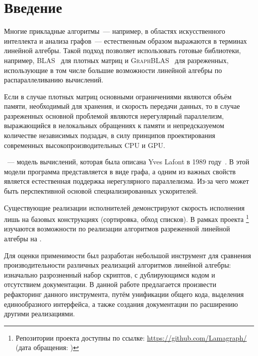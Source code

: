 
\section*{Введение}

Многие прикладные алгоритмы~--- например, в областях искусственного интеллекта и анализа графов~--- естественным образом выражаются в терминах линейной алгебры.
Такой подход позволяет использовать готовые библиотеки, например, \textsc{BLAS}~\cite{blas} для плотных матриц и \textsc{GraphBLAS}~\cite{graphblas} для разреженных, использующие в том числе большие возможности линейной алгебры по распараллеливанию вычислений.

Если в случае плотных матриц основными ограничениями являются объём памяти, необходимый для хранения, и скорость передачи данных, то в случае разреженных основной проблемой являются нерегулярный параллелизм, выражающийся в нелокальных обращениях к памяти и непредсказуемом количестве независимых подзадач, в силу принципов проектирования современных высокопроизводительных CPU и GPU.

\INs{}~--- модель вычислений, которая была описана Yves Lafont в 1989 году~\cite{lafontInteractionNets1989}.
В этой модели программа представляется в виде графа, а одним из важных свойств является естественная поддержка нерегулярного параллелизма.
Из-за чего \INs{} может быть перспективной основой специализированных ускорителей.

Существующие реализации исполнителей \INs{} демонстрируют скорость исполнения лишь на базовых конструкциях (сортировка, обход списков).
В рамках проекта \Lamagraph{}\footnote{Репозитории проекта доступны по ссылке: \url{https://github.com/Lamagraph/} (дата обращения: )} изучаются возможности по реализации алгоритмов разреженной линейной алгебры на \INs{}.

Для оценки применимости \INs{} был разработан небольшой инструмент для сравнения производительности различных реализаций алгоритмов линейной алгебры: изначально разрозненный набор скриптов, с дублирующимся кодом и отсутствием документации.
В данной работе предлагается произвести рефакторинг данного инструмента, путём унификации общего кода, выделения единообразного интерфейса, а также создания документации по расширению другими реализациями.
